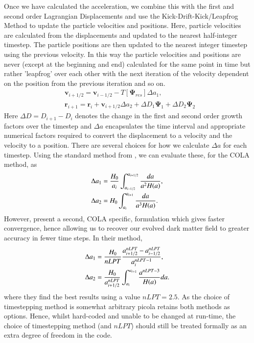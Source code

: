 \documentclass[5p,authoryear]{elsarticle}
\begin{document}
Once we have calculated the acceleration, we combine this with the first and second order Lagrangian Displacements and use the Kick-Drift-Kick/Leapfrog Method \citep{Quinn1998} to update the particle velocities and positions. Here, particle velocities are calculated from the displacements and updated to the nearest half-integer timestep. The particle positions are then updated to the nearest integer timestep using the previous velocity. In this way the particle velocities and positions are never (except at the beginning and end) calculated for the same point in time but rather 'leapfrog' over each other with the next iteration of the velocity dependent on the position from the previous iteration and so on. 
\begin{align}
&\boldsymbol{v}_{i+1/2} = \boldsymbol{v}_{i-1/2} - T[\boldsymbol{\Psi}_{res}]\Delta a_{1}, \\
&\boldsymbol{r}_{i+1} = \boldsymbol{r}_{i} + \boldsymbol{v}_{i+1/2}\Delta a_{2} + \Delta D_{1}\boldsymbol{\Psi}_{1} + \Delta D_{2}\boldsymbol{\Psi}_{2}
\end{align}
Here $\Delta D = D_{i+1} - D_{i}$ denotes the change in the first and second order growth factors over the timestep and $\Delta a$ encapsulates the time interval and appropriate numerical factors required to convert the displacement to a velocity and the velocity to a position. There are several choices for how we calculate $\Delta a$ for each timestep. Using the standard method from \cite{Quinn1998}, we can evaluate these, for the COLA method, as
\begin{align}
\Delta a_{1} &= \frac{H_{0}}{a_{i}}\int_{a_{i-1/2}}^{a_{i+1/2}} \frac{da}{a^{2}H(a)}, \notag \\
\Delta a_{2} &= H_{0}\int_{a_{i}}^{a_{i+1}}\frac{da}{a^{3}H(a)}.
\end{align}
However, \cite{Tassev2013} present a second, COLA specific, formulation which gives faster convergence, hence allowing us to recover our evolved dark matter field to greater accuracy in fewer time steps. In their method,
\begin{align}
\Delta a_{1} &= \frac{H_{0}}{nLPT}\frac{a_{i+1/2}^{nLPT}-a_{i-1/2}^{nLPT}}{a_{i}^{nLPT-1}}, \notag \\
\Delta a_{2} &= \frac{H_{0}}{a_{i+1/2}^{nLPT}}\int_{a_{i}}^{a_{i+1}}\frac{a^{nLPT-3}}{H(a)} da.
\end{align}
where they find the best results using a value $nLPT=2.5$. As the choice of timestepping method is somewhat arbitrary {\sc picola} retains both methods as options. Hence, whilst hard-coded and unable to be changed at run-time, the choice of timestepping method (and $nLPT$) should still be treated formally as an extra degree of freedom in the code. 
\end{document}
